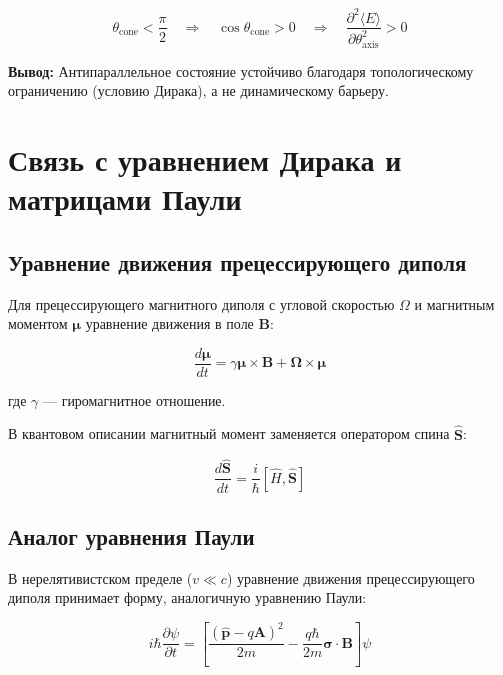 \documentclass[12pt]{article}
\begin{document}
\begin{equation}
\theta_{\text{cone}} < \frac{\pi}{2} \quad \Rightarrow \quad \cos\theta_{\text{cone}} > 0 \quad \Rightarrow \quad \frac{\partial^2 \langle E \rangle}{\partial \theta_{\text{axis}}^2} > 0
\label{eq:stability_condition}
\end{equation}

\textbf{Вывод:} Антипараллельное состояние устойчиво благодаря топологическому ограничению (условию Дирака), а не динамическому барьеру.

\section{Связь с уравнением Дирака и матрицами Паули}

\subsection{Уравнение движения прецессирующего диполя}

Для прецессирующего магнитного диполя с угловой скоростью $\Omega$ и магнитным моментом $\boldsymbol{\mu}$ уравнение движения в поле $\boldsymbol{B}$:

\begin{equation}
\frac{d\boldsymbol{\mu}}{dt} = \gamma \boldsymbol{\mu} \times \boldsymbol{B} + \boldsymbol{\Omega} \times \boldsymbol{\mu}
\label{eq:dipole_equation}
\end{equation}

где $\gamma$ — гиромагнитное отношение.

В квантовом описании магнитный момент заменяется оператором спина $\hat{\boldsymbol{S}}$:

\begin{equation}
\frac{d\hat{\boldsymbol{S}}}{dt} = \frac{i}{\hbar} [\hat{H}, \hat{\boldsymbol{S}}]
\label{eq:quantum_spin}
\end{equation}

\subsection{Аналог уравнения Паули}

В нерелятивистском пределе ($v \ll c$) уравнение движения прецессирующего диполя принимает форму, аналогичную уравнению Паули:

\begin{equation}
i\hbar \frac{\partial \psi}{\partial t} = \left[ \frac{(\hat{\boldsymbol{p}} - q\boldsymbol{A})^2}{2m} - \frac{q\hbar}{2m} \boldsymbol{\sigma} \cdot \boldsymbol{B} \right] \psi
\label{eq:pauli_equation}
\end{equation}
\end{document}
